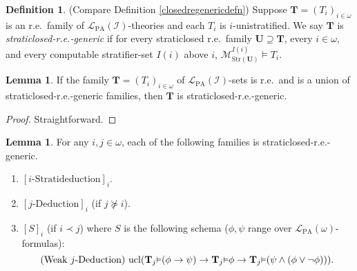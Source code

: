 \documentclass[reqno]{article}
\theoremstyle{definition}
\newtheorem{lemma}[theorem]{Lemma}
\newtheorem{definition}[theorem]{Definition}
\def\L{\mathscr{L}}
\def\M{\mathscr{M}}
\def\T{\mathbf{T}}
\def\U{\mathbf{U}}
\def\LPA{\L_{\mathrm{PA}}}
\def\indset{\mathcal I}
\renewcommand{\Pr}[1]{\T_{#1}\mbox{\small${\vDash}$}}
\newcommand{\ucl}[1]{\mathrm{ucl}(#1)}
\newcommand{\str}[1]{\mathrm{Str}(#1)} \newcommand{\Str}[1]{\str{#1}}
\begin{document}
\begin{definition}
\label{bootstrapclosedrestrat}
(Compare Definition \ref{closedregenericdefn})
Suppose $\T=(T_i)_{i\in\omega}$
is an r.e.~family of $\LPA(\indset)$-theories
and each $T_i$ is $i$-unistratified.
We say $\T$ is \emph{straticlosed-r.e.-generic} if
for every straticlosed r.e.~family $\U\supseteq\T$, every $i\in\omega$,
and every computable stratifier-set $I(i)$ above $i$,
$\M^{I(i)}_{\str\U}\models T_i$.
\end{definition}


\begin{lemma}
If the family $\T=(T_i)_{i\in\omega}$ of $\LPA(\indset)$-sets is r.e.~and is a union
of straticlosed-r.e.-generic families, then $\T$ is straticlosed-r.e.-generic.
\end{lemma}

\begin{proof}
Straightforward.
\end{proof}

\begin{lemma}
\label{secondutilbagdeduction}
For any $i,j\in\omega$, each of the following families is straticlosed-r.e.-generic.
\begin{enumerate}
\item $[\mbox{$i$-Stratideduction}]_i$.
\item $[\mbox{$j$-Deduction}]_i$ (if $j\not\succeq i$).
\item $[S]_i$ (if $i\prec j$) where $S$ is the following schema ($\phi,\psi$
    range over $\LPA(\omega)$-formulas):
\[
  \mbox{
    (Weak $j$-Deduction) $\ucl{\Pr j(\phi\rightarrow\psi)\rightarrow\Pr j\phi\rightarrow \Pr 
    j(\psi\wedge(\phi\vee\neg\phi))}$.
  }
\]
\end{enumerate}
\end{lemma}
\end{document}
